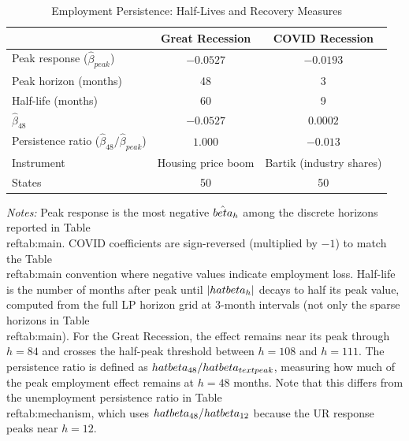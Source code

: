 \begin{table}[H]
\centering
\caption{Employment Persistence: Half-Lives and Recovery Measures}
\begin{threeparttable}
\begin{tabular}{lcc}
\toprule
& Great Recession & COVID Recession \\
\midrule
Peak response ($\hat{\beta}_{peak}$) & $-0.0527$ & $-0.0193$ \\
Peak horizon (months) & 48 & 3 \\
Half-life (months) & 60 & 9 \\
$\hat{\beta}_{48}$ & $-0.0527$ & $0.0002$ \\
Persistence ratio ($\hat{\beta}_{48} / \hat{\beta}_{peak}$) & $1.000$ & $-0.013$ \\
\midrule
Instrument & Housing price boom & Bartik (industry shares) \\
States & 50 & 50 \\
\bottomrule
\end{tabular}
\begin{tablenotes}[flushleft]
\small
\item \textit{Notes:} Peak response is the most negative $\hat{\\beta}_h$ among the discrete horizons reported in Table~\\ref{tab:main}. COVID coefficients are sign-reversed (multiplied by $-1$) to match the Table~\\ref{tab:main} convention where negative values indicate employment loss. Half-life is the number of months after peak until $|\\hat{\\beta}_h|$ decays to half its peak value, computed from the full LP horizon grid at 3-month intervals (not only the sparse horizons in Table~\\ref{tab:main}). For the Great Recession, the effect remains near its peak through $h = 84$ and crosses the half-peak threshold between $h = 108$ and $h = 111$. The persistence ratio is defined as $\\hat{\\beta}_{48} / \\hat{\\beta}_{\\text{peak}}$, measuring how much of the peak employment effect remains at $h=48$ months. Note that this differs from the unemployment persistence ratio in Table~\\ref{tab:mechanism}, which uses $\\hat{\\beta}_{48} / \\hat{\\beta}_{12}$ because the UR response peaks near $h=12$.
\end{tablenotes}
\end{threeparttable}
\label{tab:halflife}
\end{table}
